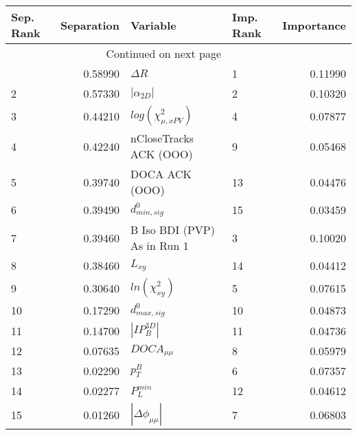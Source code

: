\usepackage{lscape}

\begin{landscape}
\begin{longtable}{lrllr}
\toprule
Sep. Rank &  Separation &                     Variable & Imp. Rank &  Importance \\
\midrule
\endhead
\midrule
\multicolumn{3}{r}{{Continued on next page}} \\
\midrule
\endfoot

\bottomrule
\endlastfoot
        1 &     0.58990 &                   $\Delta R$ &         1 &     0.11990 \\
        2 &     0.57330 &              $|\alpha_{2D}|$ &         2 &     0.10320 \\
        3 &     0.44210 &    $log(\chi^{2}_{\mu,xPV})$ &         4 &     0.07877 \\
        4 &     0.42240 &       nCloseTracks ACK (OOO) &         9 &     0.05468 \\
        5 &     0.39740 &               DOCA ACK (OOO) &        13 &     0.04476 \\
        6 &     0.39490 &             $d^0_{min, sig}$ &        15 &     0.03459 \\
        7 &     0.39460 &  B Iso BDI (PVP) As in Run 1 &         3 &     0.10020 \\
        8 &     0.38460 &                     $L_{xy}$ &        14 &     0.04412 \\
        9 &     0.30640 &          $ln(\chi^{2}_{xy})$ &         5 &     0.07615 \\
       10 &     0.17290 &             $d^0_{max, sig}$ &        10 &     0.04873 \\
       11 &     0.14700 &              $|IP_{B}^{3D}|$ &        11 &     0.04736 \\
       12 &     0.07635 &              $DOCA_{\mu\mu}$ &         8 &     0.05979 \\
       13 &     0.02290 &                    $p^B_{T}$ &         6 &     0.07357 \\
       14 &     0.02277 &                $P^{min}_{L}$ &        12 &     0.04612 \\
       15 &     0.01260 &     $|\Delta \phi_{\mu\mu}|$ &         7 &     0.06803 \\
\end{longtable}

\end{landscape}
